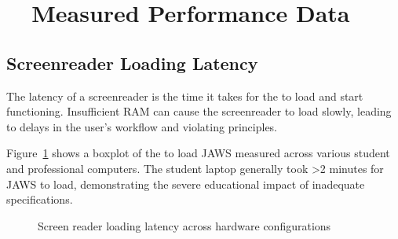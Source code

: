 \hypertarget{measured-performance-data}{}\section{~~Measured Performance Data}\label{measured-performance-data}

\subsection{Screenreader Loading Latency}\label{screenreader-loading-latency}

The latency of a screenreader is the time it takes for the  to load and start functioning. Insufficient RAM can cause the screenreader to load slowly, leading to delays in the user's workflow and violating  principles.

Figure~\ref{fig:figure1} shows a boxplot of the  to load JAWS measured across various student and professional computers. The student laptop generally took >2 minutes for JAWS to load, demonstrating the severe educational impact of inadequate  specifications.

\begin{figure}[htbp]
	\centering
	\caption{Screen reader loading latency across hardware configurations}
	\label{fig:figure1}
\end{figure}

